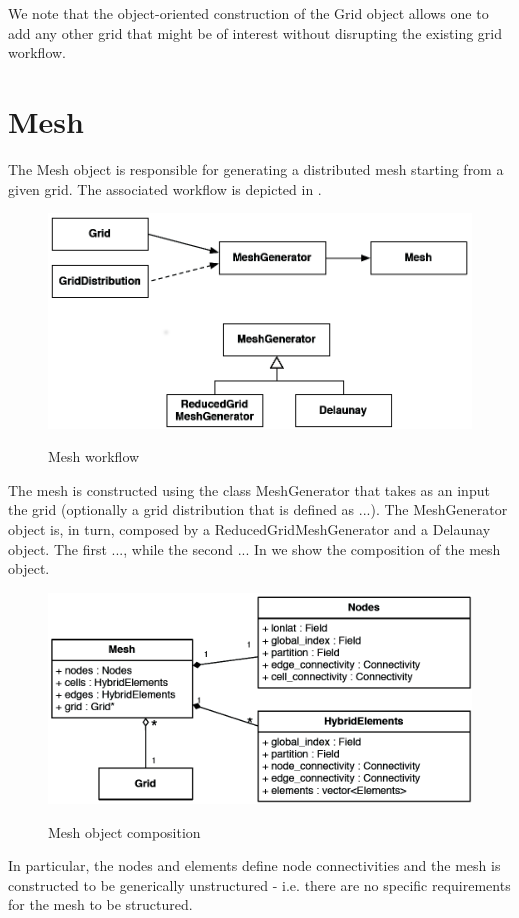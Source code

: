 We note that the object-oriented construction of the Grid 
object allows one to add any other grid that might be of 
interest without disrupting the existing grid workflow.



\section{Mesh}
The Mesh object is responsible for generating a distributed 
mesh starting from a given grid. The associated workflow is 
depicted in .
%
\begin{figure}
\centering
\includegraphics[scale=0.25]{imgs/mesh1.png}
\label{fig:mesh1}
\caption{Mesh workflow}
\end{figure}
%
The mesh is constructed using the class MeshGenerator that 
takes as an input the grid (optionally a grid distribution 
that is defined as ...).
The MeshGenerator object is, in turn, composed by a ReducedGridMeshGenerator 
and a Delaunay object. The first ..., while the second ... 
In  we show the composition of the mesh object.
%
\begin{figure}
\centering
\includegraphics[scale=0.25]{imgs/mesh2.png}
\label{fig:mesh2}
\caption{Mesh object composition}
\end{figure}
%
In particular, the nodes and elements define node connectivities 
and the mesh is constructed to be generically unstructured - i.e. 
there are no specific requirements for the mesh to be structured.




